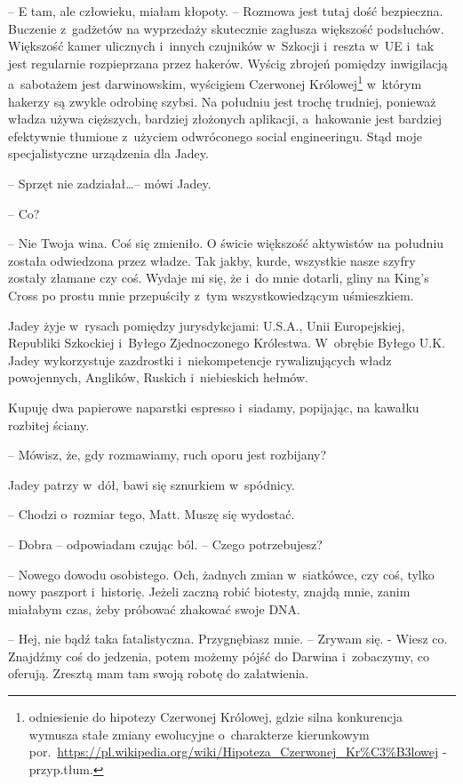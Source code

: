 \documentclass[oneside,polish,12pt,sfheadings]{mwbk}
\begin{document}
-- E tam, ale człowieku, miałam kłopoty. -- Rozmowa jest tutaj dość
bezpieczna. Buczenie z~gadżetów na wyprzedaży skutecznie zagłusza
większość podsłuchów. Większość kamer ulicznych i~innych czujników w~Szkocji i~reszta w~UE i~tak jest regularnie rozpieprzana przez hakerów.
Wyścig zbrojeń pomiędzy inwigilacją a~sabotażem jest darwinowskim,
wyścigiem Czerwonej Królowej\footnote{odniesienie do
hipotezy Czerwonej Królowej, gdzie silna konkurencja wymusza stałe
zmiany ewolucyjne o~charakterze kierunkowym por.~\url{https://pl.wikipedia.org/wiki/Hipoteza\_Czerwonej\_Kr\%C3\%B3lowej} -
przyp.tłum.} w~którym hakerzy są zwykle odrobinę szybsi. Na południu
jest trochę trudniej, ponieważ władza używa cięższych, bardziej
złożonych aplikacji, a~hakowanie jest bardziej efektywnie tłumione z~użyciem odwróconego social engineeringu. Stąd moje specjalistyczne
urządzenia dla Jadey.

-- Sprzęt nie zadziałał\ldots -- mówi Jadey.

-- Co?

-- Nie Twoja wina. Coś się zmieniło. O świcie większość aktywistów na
południu została odwiedzona przez władze. Tak jakby, kurde, wszystkie
nasze szyfry zostały złamane czy coś. Wydaje mi się, że i~do mnie
dotarli, gliny na King's Cross po prostu mnie przepuściły z~tym
wszystkowiedzącym uśmieszkiem.

Jadey żyje w~rysach pomiędzy jurysdykcjami: U.S.A., Unii Europejskiej,
Republiki Szkockiej i~Byłego Zjednoczonego Królestwa. W~obrębie Byłego
U.K. Jadey wykorzystuje zazdrostki i~niekompetencje rywalizujących władz
powojennych, Anglików, Ruskich i~niebieskich hełmów.

Kupuję dwa papierowe naparstki espresso i~siadamy, popijając, na kawałku
rozbitej ściany.

-- Mówisz, że, gdy rozmawiamy, ruch oporu jest rozbijany?

Jadey patrzy w~dół, bawi się sznurkiem w~spódnicy. 

-- Chodzi o~rozmiar tego, Matt. Muszę się wydostać.

-- Dobra -- odpowiadam czując ból. -- Czego potrzebujesz?

-- Nowego dowodu osobistego. Och, żadnych zmian w~siatkówce, czy coś,
tylko nowy paszport i~historię. Jeżeli zaczną robić biotesty, znajdą
mnie, zanim miałabym czas, żeby próbować zhakować swoje DNA.

-- Hej, nie bądź taka fatalistyczna. Przygnębiasz mnie. -- Zrywam się. -
Wiesz co. Znajdźmy coś do jedzenia, potem możemy pójść do Darwina i~zobaczymy, co oferują. Zresztą mam tam swoją robotę do załatwienia.
\end{document}
